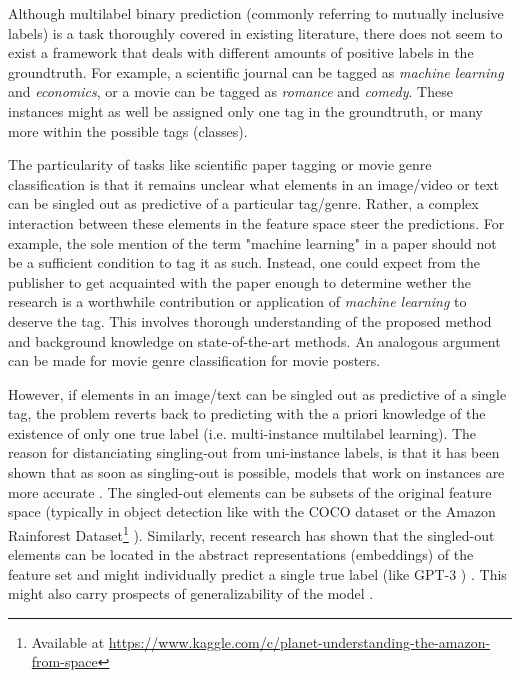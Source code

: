 Although multilabel binary prediction (commonly referring to mutually inclusive labels) is a task thoroughly covered in existing literature, there does not seem to exist a framework that deals with different amounts of positive labels in the groundtruth. For example, a scientific journal can be tagged as \emph{machine learning} and \emph{economics}, or a movie can be tagged as \emph{romance} and \emph{comedy}. These instances might as well be assigned only one tag in the groundtruth, or many more within the possible tags (classes).


The particularity of tasks like scientific paper tagging or movie genre classification is that it remains unclear what elements in an image/video or text can be singled out as predictive of a particular tag/genre. Rather, a complex interaction between these elements in the feature space steer the predictions. For example, the sole mention of the term "machine learning" in a paper should not be a sufficient condition to tag it as such. Instead, one could expect from the publisher to get acquainted with the paper enough to determine wether the research is a worthwhile contribution or application of \emph{machine learning} to deserve the tag. This involves thorough understanding of the proposed method and background knowledge on state-of-the-art methods. An analogous argument can be made for movie genre classification for movie posters.

However, if elements in an image/text can be singled out as predictive of a single tag, the problem reverts back to predicting with the a priori knowledge of the existence of only one true label (i.e. multi-instance multilabel learning).  The reason for distanciating singling-out from uni-instance labels, is that it has been shown that as soon as singling-out is possible, models that work on instances are more accurate . The singled-out elements can be subsets of the original feature space (typically in object detection like with the COCO dataset  \cite{COCO} or the Amazon Rainforest Dataset\footnote{Available at \url{https://www.kaggle.com/c/planet-understanding-the-amazon-from-space}} ). Similarly, recent research has shown that the singled-out elements can be located in the abstract representations (embeddings) of the feature set and might individually predict a single true label (like GPT-3 ) . This might also carry prospects of generalizability of the model \cite{generalization} . 


